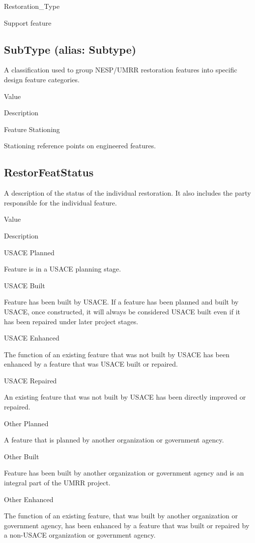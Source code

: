 \documentclass[
  letterpaper,
  DIV=11,
  numbers=noendperiod]{scrreprt}
\begin{document}
Restoration\_Type

Support feature

\subsection{SubType (alias: Subtype)}\label{subtype-alias-subtype-21}

A classification used to group NESP/UMRR restoration features into
specific design feature categories.

Value

Description

Feature Stationing

Stationing reference points on engineered features.

\subsection{RestorFeatStatus}\label{restorfeatstatus-21}

A description of the status of the individual restoration. It also
includes the party responsible for the individual feature.

Value

Description

USACE Planned

Feature is in a USACE planning stage.

USACE Built

Feature has been built by USACE. If a feature has been planned and built
by USACE, once constructed, it will always be considered USACE built
even if it has been repaired under later project stages.

USACE Enhanced

The function of an existing feature that was not built by USACE has been
enhanced by a feature that was USACE built or repaired.

USACE Repaired

An existing feature that was not built by USACE has been directly
improved or repaired.

Other Planned

A feature that is planned by another organization or government agency.

Other Built

Feature has been built by another organization or government agency and
is an integral part of the UMRR project.

Other Enhanced

The function of an existing feature, that was built by another
organization or government agency, has been enhanced by a feature that
was built or repaired by a non-USACE organization or government agency.
\end{document}

